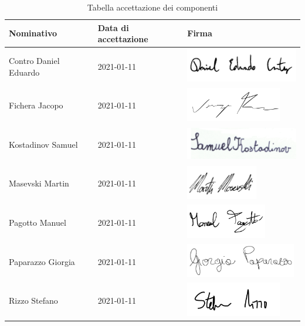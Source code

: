 \documentclass[../piano_di_progetto.tex]{subfiles}
\begin{document}
\begin{table}[!ht]
	\centering
	\begin{tabular}{|l|l|l|}
		\hline
		\rowcolor{lightgray}
		\textbf{Nominativo} & \textbf{Data di accettazione} & \textbf{Firma} \\ 
		\hline
		Contro Daniel Eduardo & 2021-01-11 & \includegraphics[height=1.5cm]{componenti/img/firma_dec} \\ 
		\hline
		Fichera Jacopo & 2021-01-11 & \includegraphics[height=1.5cm]{componenti/img/firma_jf} \\ 
		\hline
		Kostadinov Samuel & 2021-01-11 & \includegraphics[height=1.5cm]{componenti/img/firma_sk} \\
		\hline
		Masevski Martin & 2021-01-11 & \includegraphics[height=1.5cm]{componenti/img/firma_mm} \\ 
		\hline
		Pagotto Manuel & 2021-01-11 & \includegraphics[height=1.5cm]{componenti/img/firma_mp}  \\ 
		\hline
		Paparazzo Giorgia & 2021-01-11 & \includegraphics[height=1.5cm]{componenti/img/firma_gp} \\
		\hline
		Rizzo Stefano & 2021-01-11 & \includegraphics[height=1.5cm]{componenti/img/firma_sr}  \\ 
		\hline

	\end{tabular}
		\caption{Tabella accettazione dei componenti}
\end{table}
\end{document}
